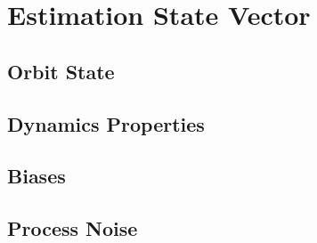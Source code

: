 \section{Estimation State Vector}

\subsection{Orbit State}

\subsection{Dynamics Properties}

\subsection{Biases}

\subsection{Process Noise}
